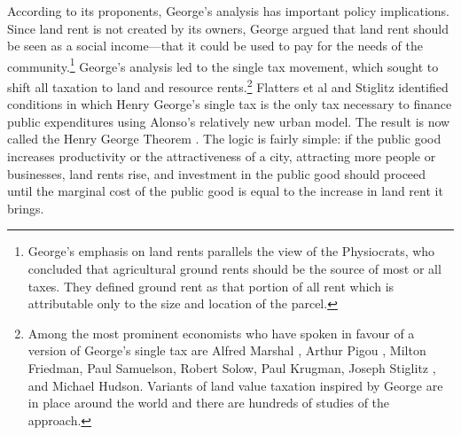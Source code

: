
According to its proponents, George's analysis  has important policy implications. Since land rent is not created by its owners, George argued that land rent should be seen as a social income---that it could be used to pay for the needs of the community.\footnote{George's emphasis on land rents parallels the view of the Physiocrats, who concluded that agricultural \gls{ground rents} should be the source of most or all taxes. They defined ground rent as that portion of all rent which is attributable only to the size and location of the parcel.} %
George's analysis led to the {single tax} movement, which sought to shift all taxation to land  and resource rents.\footnote{Among the most prominent economists who have spoken in favour of a version of George's single tax are Alfred Marshal \cite{marshallPrinciplesEconomics1890}, %
Arthur Pigou \cite{pigouPolicyLandTaxation1909}, Milton Friedman, Paul Samuelson, Robert Solow, Paul Krugman, Joseph Stiglitz \cite{stiglitzTheoryLocalPublic1977}, and %
Michael Hudson. Variants of land value taxation inspired by George are in place around the world and there are hundreds of studies of the approach.} 
Flatters et al \cite{flattersPublicGoodsEfficiency1974} and  Stiglitz \cite{stiglitzTheoryLocalPublic1977} identified  conditions in which Henry George's \gls{single tax} is the only tax necessary to finance public expenditures using Alonso's relatively new urban model. The result is now called the \gls{Henry George Theorem} \cite{arnottAggregateLandRents1979}.
The logic is fairly simple: if the public good increases productivity or the attractiveness of a city, attracting more people or businesses, land rents rise, and investment in the public good should proceed until the marginal cost of the public good is equal to the increase in land rent it brings. %


